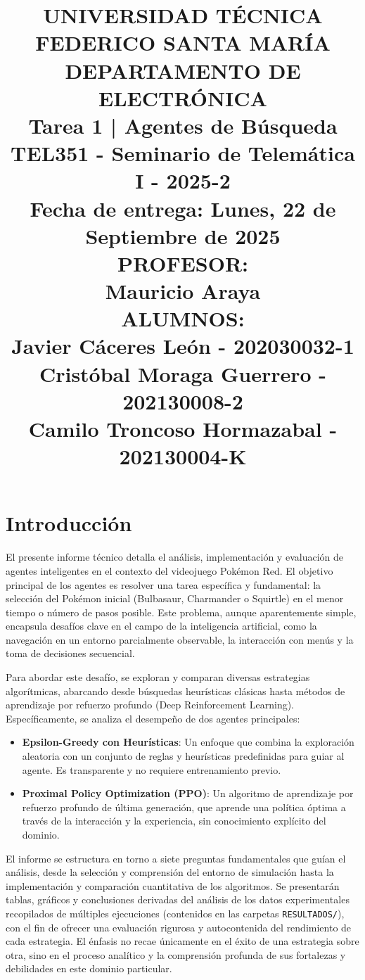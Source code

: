\documentclass[12pt, oneside, openany]{book}
\title{
    {\Large \textbf{UNIVERSIDAD TÉCNICA FEDERICO SANTA MARÍA}}\\[1mm]
    {\large DEPARTAMENTO DE ELECTRÓNICA}\\[1mm]
    {\Large \textbf{Tarea 1 | Agentes de Búsqueda}}\\[2mm]
    {\Large TEL351 - Seminario de Telemática I - 2025-2}\\[1mm]
    {\large Fecha de entrega: Lunes, 22 de Septiembre de 2025}\\[0.5mm]
    {\normalsize PROFESOR:}\\[0.5mm]
    {\normalsize Mauricio Araya}\\[0.5mm]
    {\normalsize ALUMNOS:}\\[0.5mm]
    {\normalsize 
    Javier Cáceres León - 202030032-1}\\[0.5mm]
    {\normalsize Cristóbal Moraga Guerrero - 202130008-2}\\[0.5mm]
    {\normalsize Camilo Troncoso Hormazabal - 202130004-K}\\[0.5mm]
}
\author{}
\date{}
\begin{document}
\maketitle
\tableofcontents
\newpage

\section{Introducción}
El presente informe técnico detalla el análisis, implementación y evaluación de agentes inteligentes en el contexto del videojuego Pokémon Red. El objetivo principal de los agentes es resolver una tarea específica y fundamental: la selección del Pokémon inicial (Bulbasaur, Charmander o Squirtle) en el menor tiempo o número de pasos posible. Este problema, aunque aparentemente simple, encapsula desafíos clave en el campo de la inteligencia artificial, como la navegación en un entorno parcialmente observable, la interacción con menús y la toma de decisiones secuencial.

Para abordar este desafío, se exploran y comparan diversas estrategias algorítmicas, abarcando desde búsquedas heurísticas clásicas hasta métodos de aprendizaje por refuerzo profundo (Deep Reinforcement Learning). Específicamente, se analiza el desempeño de dos agentes principales:
\begin{itemize}
    \item \textbf{Epsilon-Greedy con Heurísticas}: Un enfoque que combina la exploración aleatoria con un conjunto de reglas y heurísticas predefinidas para guiar al agente. Es transparente y no requiere entrenamiento previo.
    \item \textbf{Proximal Policy Optimization (PPO)}: Un algoritmo de aprendizaje por refuerzo profundo de última generación, que aprende una política óptima a través de la interacción y la experiencia, sin conocimiento explícito del dominio.
\end{itemize}

El informe se estructura en torno a siete preguntas fundamentales que guían el análisis, desde la selección y comprensión del entorno de simulación hasta la implementación y comparación cuantitativa de los algoritmos. Se presentarán tablas, gráficos y conclusiones derivadas del análisis de los datos experimentales recopilados de múltiples ejecuciones (contenidos en las carpetas \texttt{RESULTADOS/}), con el fin de ofrecer una evaluación rigurosa y autocontenida del rendimiento de cada estrategia. El énfasis no recae únicamente en el éxito de una estrategia sobre otra, sino en el proceso analítico y la comprensión profunda de sus fortalezas y debilidades en este dominio particular.
\end{document}
